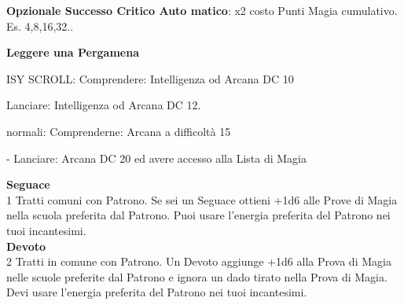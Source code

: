 \documentclass[landscape,10pt,a4paper]{article}
\begin{document}
\begin{multicols}{2}
	
	
	\textbf{Opzionale Successo Critico Auto matico}:  x2 costo Punti Magia cumulativo. Es. 4,8,16,32..
	
	
	
	\textbf{Leggere una Pergamena}
	
	ISY SCROLL: Comprendere: Intelligenza od Arcana DC 10
	
	Lanciare: Intelligenza od Arcana DC 12.
	
	normali: Comprenderne: Arcana a difficoltà 15
	
	- Lanciare: Arcana DC 20 ed avere accesso alla Lista di Magia
	
	\textbf{Seguace}\\
	1 Tratti comuni con Patrono. Se sei un Seguace ottieni +1d6 alle Prove di Magia nella scuola preferita dal Patrono. Puoi usare l'energia preferita del Patrono nei tuoi incantesimi.\\
	
	
	
	\textbf{Devoto}\\
	2 Tratti in comune con Patrono. Un Devoto aggiunge +1d6 alla Prova di Magia nelle scuole preferite dal Patrono e ignora un dado tirato nella Prova di Magia. Devi usare l'energia preferita del Patrono nei tuoi incantesimi.
	
	
	

\end{multicols}
\end{document}
